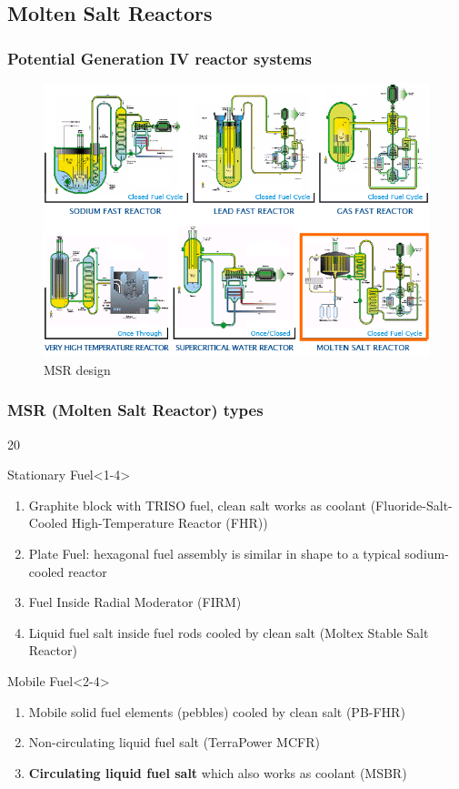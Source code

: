 \subsection{Molten Salt Reactors}

\begin{frame}
\frametitle{Potential Generation IV reactor systems \cite{abram_generation-iv_2008}}
\begin{figure}[t]
	\vspace*{-0.1in}
	\includegraphics[height=0.7\textwidth]{./images/6_types.png}
	\caption{\gls{MSR} design}
\end{figure}            
\end{frame}


\begin{frame}
\frametitle{MSR (Molten Salt Reactor) types}
\begin{overlayarea}{\linewidth}{20\baselineskip}
\begin{block}{Stationary Fuel}<1-4>
	\begin{enumerate}
		\item Graphite block with TRISO fuel, clean salt works as 
		coolant (Fluoride-Salt-Cooled High-Temperature 
		Reactor (FHR))
		\item Plate Fuel: hexagonal fuel assembly is similar in shape to a typical sodium-cooled reactor
		\item Fuel Inside Radial Moderator (FIRM)
		\item Liquid fuel salt inside fuel rods cooled by clean salt 
		(Moltex Stable Salt Reactor)
	\end{enumerate}
\end{block}

\begin{block}{Mobile Fuel}<2-4>
	\begin{enumerate}
		\item<2-4> Mobile solid fuel elements (pebbles) cooled by 
		clean salt (PB-FHR)
		\item<3-4> Non-circulating liquid fuel salt (TerraPower \gls{MCFR}) 
		\item<4> \textbf{Circulating liquid fuel salt} which also works 
		as coolant (\gls{MSBR})
	\end{enumerate}
\end{block}
\end{overlayarea}
\end{frame}


